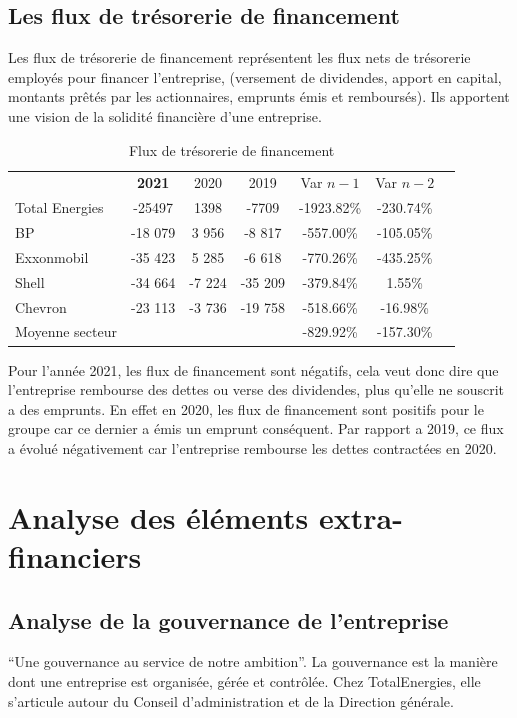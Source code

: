 \documentclass[12pt]{article}
\begin{document}
\subsection{Les flux de trésorerie de financement}
Les flux de trésorerie de financement représentent les flux nets de trésorerie employés pour
financer l'entreprise, (versement de dividendes, apport en capital, montants prêtés par les
actionnaires, emprunts émis et remboursés). Ils apportent une vision de la solidité financière d'une entreprise. 
\begin{table}[H]
    \centering
    \sffamily
    \caption{Flux de trésorerie de financement}
    \label{table:fluxFin}
    \begin{tabular}{l*{1}{cccccc}}
        \toprule
        ~ & \textbf{2021} & 2020 & 2019 & Var $n-1$ & Var $n-2$ \\ 
        \cmidrule(r){1-1}\cmidrule(r){2-4}\cmidrule(r){5-6}
Total Energies & -25497 & 1398 & -7709 & -1923.82\% & -230.74\% \\ 
\cmidrule(r){1-1}\cmidrule(r){2-4}\cmidrule(r){5-6}
BP & -18 079 & 3 956 & -8 817 & -557.00\% & -105.05\% \\ 
Exxonmobil & -35 423 & 5 285 & -6 618 & -770.26\% & -435.25\% \\ 
Shell & -34 664 & -7 224 & -35 209 & -379.84\% & 1.55\% \\ 
Chevron & -23 113 & -3 736 & -19 758 & -518.66\% & -16.98\% \\ 
\cmidrule(r){1-1}\cmidrule(r){2-4}\cmidrule(r){5-6}
Moyenne secteur & ~ & ~ & ~ & -829.92\% & -157.30\% \\ 
\bottomrule
    \end{tabular}
\end{table}
Pour l'année 2021, les flux de financement sont négatifs, cela veut donc dire que l'entreprise
rembourse des dettes ou verse des dividendes, plus qu'elle ne souscrit a des emprunts.
En effet en 2020, les flux de financement sont positifs pour le groupe car ce dernier a émis
un emprunt conséquent. Par rapport a 2019, ce flux a évolué négativement car l'entreprise 
rembourse les dettes contractées en 2020.
\section{Analyse des éléments extra-financiers}
\subsection{Analyse de la gouvernance de l'entreprise}
“Une gouvernance au service de notre ambition”.
La gouvernance est la manière dont une entreprise est organisée, gérée et contrôlée. Chez TotalEnergies, elle s'articule autour du Conseil d'administration et de la Direction générale.
\end{document}
